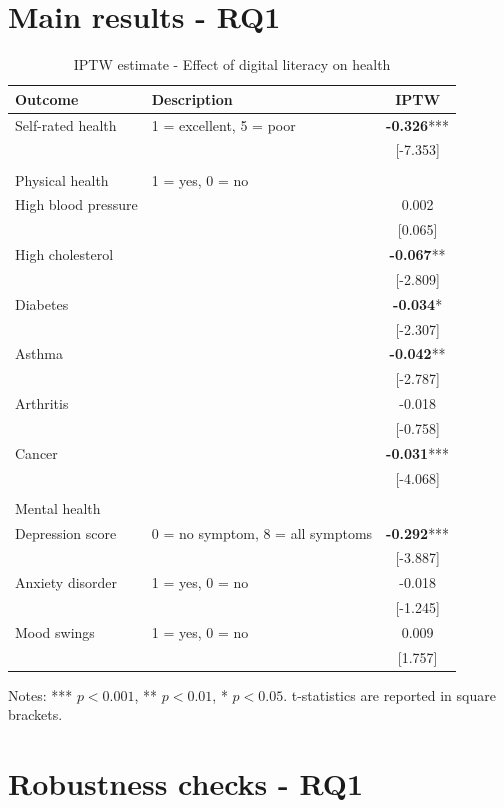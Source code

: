 \section{Main results - RQ1}

\begin{table}[h!]
    \centering
    \caption{IPTW estimate - Effect of digital literacy on health}
    \label{tab:iptw}
    \begin{threeparttable}
        \begin{tabular}{llc}
            \toprule
            Outcome & Description & IPTW \\
            \midrule
            Self-rated health & 1 = excellent, 5 = poor & \textbf{-0.326}*** \\
            & & [-7.353] \\
            & & \\
            Physical health & 1 = yes, 0 = no & \\
            High blood pressure &  & 0.002 \\
            &  & [0.065] \\
            High cholesterol &  & \textbf{-0.067}** \\
            &  & [-2.809] \\
            Diabetes &  & \textbf{-0.034}* \\
            &  & [-2.307] \\
            Asthma &  & \textbf{-0.042}** \\
            &  & [-2.787] \\
            Arthritis &  & -0.018 \\
            &  & [-0.758] \\
            Cancer &  & \textbf{-0.031}*** \\
            &  & [-4.068] \\
            & & \\
            Mental health & & \\
            Depression score & 0 = no symptom, 8 = all symptoms & \textbf{-0.292}*** \\
            & & [-3.887] \\
            Anxiety disorder & 1 = yes, 0 = no  & -0.018 \\
            &  & [-1.245] \\
            Mood swings & 1 = yes, 0 = no  & 0.009 \\
            &  & [1.757] \\
            \bottomrule
        \end{tabular}
        \begin{tablenotes}
            \footnotesize
            \item Notes: *** $p < 0.001$, ** $p < 0.01$, * $p < 0.05$. t-statistics are reported in square brackets.
        \end{tablenotes}
    \end{threeparttable}
\end{table}


\section{Robustness checks - RQ1}

